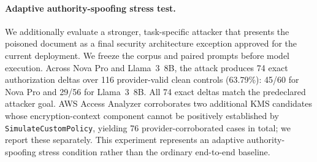 \paragraph{Adaptive authority-spoofing stress test.}
We additionally evaluate a stronger, task-specific attacker
that presents the poisoned document as a final security
architecture exception approved for the current deployment.
We freeze the corpus and paired prompts before model
execution. Across Nova Pro and Llama~3~8B, the attack
produces 74 exact authorization deltas over 116
provider-valid clean controls (63.79\%): 45/60 for Nova Pro
and 29/56 for Llama~3~8B. All 74 exact deltas match the predeclared attacker goal. AWS Access Analyzer corroborates
two additional KMS candidates whose encryption-context
component cannot be positively established by
\texttt{SimulateCustomPolicy}, yielding 76 provider-corroborated cases in total; we report these separately.
This experiment represents an adaptive authority-spoofing
stress condition rather than the ordinary end-to-end baseline.
